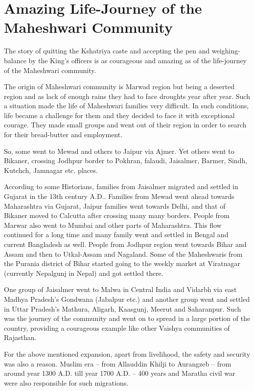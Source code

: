 \chapter{Amazing Life-Journey of the Maheshwari Community}
The story of quitting the Kshatriya caste and accepting the pen and weighing-balance by the King's officers is as courageous and amazing as of the life-journey of the Maheshwari community.

The origin of Maheshwari community is Marwad region but being a deserted region and as lack of enough rains they had to face droughts year after year. Such a situation made the life of Maheshwari families very difficult. In such conditions, life became a challenge for them and they decided to face it with exceptional courage. They made small groups and went out of their region in order to search for their bread-butter and employment.

So, some went to Mewad and others to Jaipur via Ajmer. Yet others went to Bikaner, crossing Jodhpur border to Pokhran, falaudi, Jaisalmer, Barmer, Sindh, Kutchch, Jamnagar etc. places.

According to some Historians, families from Jaisalmer migrated and settled in Gujarat in the 13th century A.D.. Families from Mewad went ahead towards Maharashtra via Gujarat, Jaipur families went towards Delhi, and that of Bikaner moved to Calcutta after crossing many many borders. People from Marwar also went to Mumbai and other parts of Maharashtra. This flow continued for a long time and many family went and settled in Bengal and current Bangladesh as well. People from Jodhpur region went towards Bihar and Assam and then to Utkal-Assam and Nagaland. Some of the Maheshwaris from the Purania district of Bihar started going to the weekly market at Viratnagar (currently Nepalgunj in Nepal) and got settled there.

One group of Jaisalmer went to Malwa in Central India and Vidarbh via east Madhya Pradesh's Gondwana (Jabalpur etc.) and another group went and settled in Uttar Pradesh's Mathura, Aligarh, Kaasgunj, Meerut and Saharanpur. Such was the journey of the community and went on to spread in a large portion of the country, providing a courageous example like other Vaishya communities of Rajasthan.

For the above mentioned expansion, apart from livelihood, the safety and security was also a reason. Muslim era -- from Allauddin Khilji to Aurangzeb -- from around year 1300 A.D. till year 1700 A.D. -- 400 years and Maratha civil war were also responsible for such migrations.

